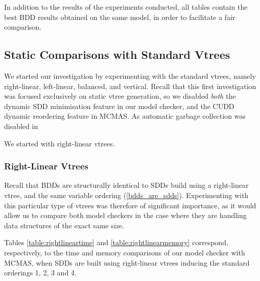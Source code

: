 \documentclass[11pt]{article}
\begin{document}
In addition to the results of the experiments conducted, all tables contain the best BDD results obtained on the same model, in order to facilitate a fair comparison.

\subsection{Static Comparisons with Standard Vtrees}

We started our investigation by experimenting with the standard vtrees, namely right-linear, left-linear, balanced, and vertical. Recall that this first investigation was focused exclusively on static vtree generation, so we disabled \textit{both }the dynamic SDD minimisation feature in our model checker, and the CUDD dynamic reordering feature in MCMAS. As automatic garbage collection was disabled in 

We started with right-linear vtrees. 

\subsubsection{Right-Linear Vtrees} 

Recall that BDDs are structurally identical to SDDs build using a right-linear vtree, and the same variable ordering (\ref{bdds_are_sdds}). Experimenting with this particular type of vtrees was therefore of significant importance, as it would allow us to compare both model checkers in the case where they are handling data structures of the exact same size.

Tables \ref{table:rightlineartime} and \ref{table:rightlinearmemory} correspond, respectively, to the time and memory comparisons of our model checker with MCMAS, when SDDs are built using right-linear vtrees inducing the standard orderings 1, 2, 3 and 4. 
\end{document}
